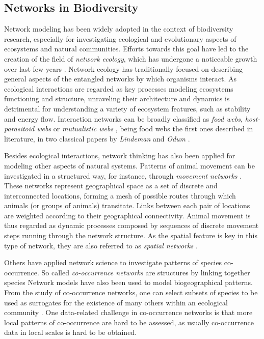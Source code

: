 \subsection{Networks in Biodiversity}
Network modeling has been widely adopted in the context of biodiversity research, especially for investigating ecological and evolutionary aspects of ecosystems and natural communities. 
Efforts towards this goal have led to the creation of the field of \textit{network ecology}, which has undergone a noticeable growth over last few years \cite{Borrett2014}.
%
Network ecology has traditionally focused on describing general aspects of the entangled networks by which organisms interact.
As ecological interactions are regarded as key processes modeling ecosystems functioning and structure, unraveling their architecture and dynamics is detrimental for understanding a variety of ecosystem features, such as stability and energy flow.
%
Interaction networks can be broadly classified as \textit{food webs}, \textit{host-parasitoid webs} or \textit{mutualistic webs} \cite{Ings2009}, being food webs the first ones described in literature, in two classical papers by \textit{Lindeman} and \textit{Odum} \cite{lindeman1942trophic, odum1956primary}. 
%

Besides ecological interactions, network thinking has also been applied for modeling other aspects of natural systems.
%
Patterns of animal movement can be investigated in a structured way, for instance, through \textit{movement networks} \cite{Jacoby2016a}.
These networks represent geographical space as a set of discrete and interconnected locations, forming a mesh of possible routes through which animals (or groups of animals) transitate. 
Links between each pair of locations are weighted according to their geographical connectivity.
Animal movement is thus regarded as dynamic processes composed by sequences of discrete movement steps running through the network structure.
As the spatial feature is key in this type of network, they are also referred to as \textit{spatial networks} \cite{Bascompte2007}.
%

Others have applied network science to investigate patterns of species co-occurrence. 
So called \textit{co-occurrence networks} are structures by linking together species 
Network models have also been used to model biogeographical patterns.
From the study of co-occurrence networks, one can select subsets of species to be used as surrogates for the existence of many others within an ecological community \cite{Tulloch2016}.
One data-related challenge in co-occurrence networks is that more local patterns of co-occurrence are hard to be assessed, as usually co-occurrence data in local scales is hard to be obtained.
\cite{Araujo2011}


